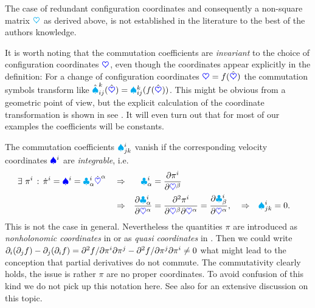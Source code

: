 The case of redundant configuration coordinates and consequently a non-square matrix $\kinMat$ as derived above, is not established in the literature to the best of the authors knowledge.

It is worth noting that the commutation coefficients are \textit{invariant} to the choice of configuration coordinates $\sysCoord$, even though the coordinates appear explicitly in the definition:
For a change of configuration coordinates $\sysCoord = f(\sysCoordW)$ the commutation symbols transform like $\BoltzSymW{\LidxIII}{\LidxI}{\LidxII}(\sysCoordW) = \BoltzSym{\LidxIII}{\LidxI}{\LidxII}(f(\sysCoordW))$.
This might be obvious from a geometric point of view, but the explicit calculation of the coordinate transformation is shown in see .
It will even turn out that for most of our examples the coefficients will be constants.

The commutation coefficients $\BoltzSym{\LidxI}{\LidxII}{\LidxIII}$ vanish if the corresponding velocity coordinates $\sysVelCoeff{\LidxI}$ are \textit{integrable}, i.e.\
\begin{align}
 \exists \ \pi^\LidxI \, : \, \dot{\pi}^\LidxI &= \sysVelCoeff{\LidxI} = \kinBasisMatCoeff{\LidxI}{\GidxI} \sysCoordCoeffd{\GidxI}&
 &\Rightarrow&
  \kinBasisMatCoeff{\LidxI}{\GidxI} &= \pdiff[\pi^i]{\sysCoordCoeff{\GidxII}}
\nonumber\\
&&
&\Rightarrow&
 \pdiff[\kinBasisMatCoeff{\LidxI}{\GidxI}]{\sysCoordCoeff{\GidxI}}
 &= \frac{\partial^2 \pi^i}{\partial \sysCoordCoeff{\GidxII} \partial \sysCoordCoeff{\GidxI}}
 = \pdiff[\kinBasisMatCoeff{\LidxI}{\beta}]{\sysCoordCoeff{\GidxI}},&
&\Rightarrow&
 \BoltzSym{\LidxI}{\LidxII}{\LidxIII} &= 0.
\end{align}
This is not the case in general.
Nevertheless the quantities $\pi$ are introduced as \textit{nonholonomic coordinates} in \cite{Boltzmann:NonholCoord} or as \textit{quasi coordinates} in \cite[sec.\,1.5]{Lurie:AnalyticalMechanics}.
Then we could write $\partial_\LidxI (\partial_\LidxII f) - \partial_\LidxII (\partial_\LidxI f) = \sfrac{\partial^2 f}{\partial \pi^\LidxI \partial \pi^\LidxII} - \sfrac{\partial^2 f}{\partial \pi^\LidxII \partial \pi^\LidxI} \neq 0$ what might lead to the conception that partial derivatives do not commute.
The commutativity clearly holds, the issue is rather $\pi$ are no proper coordinates.
To avoid confusion of this kind we do not pick up this notation here.
See also \cite{Hamel:virtuelleVerschiebungen} for an extensive discussion on this topic.


